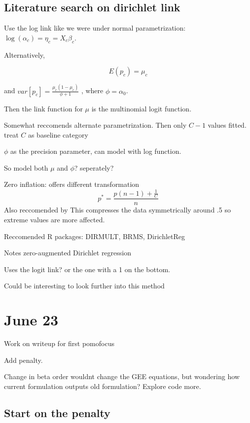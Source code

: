 \documentclass[10pt]{article}
\theoremstyle{definition}
\begin{document}
\subsection{Literature search on dirichlet link }

\cite{douma2019a} Use the log link like we were under normal parametrization: $\log(\alpha_c) = \eta_c = X_c\beta_c$.

Alternatively,

\[E(p_c) = \mu_c \]

and $var[p_c] = \frac{\mu_c(1 - \mu_c)}{\phi+ 1}$ , where $\phi = \alpha_0$.

Then the link function for $\mu$ is the multinomial logit function.

Somewhat reccomends alternate parametrization. Then only $C-1$ values fitted. treat $C$ as baseline category

$\phi$ as the precision parameter, can model with log function.

So model both $\mu$ and $\phi$? seperately?

Zero inflation: offers different transformation
\[p^* = \frac{p(n-1) + \frac{1}{C}}{n} \]
Also reccomended by \cite{maier2014}
This compresses the data symmetrically around .5 so extreme values are more affected.

Reccomended R packages: DIRMULT, BRMS, DirichletReg

Notes zero-augmented Dirichlet regression \cite{tsagris2017}

Uses the logit link? or the one with a 1 on the bottom.

Could be interesting to look further into this method


\section{June 23}

\begin{todolist}
  \item Work on writeup for first pomofocus
  \item Add penalty.
\end{todolist}


Change in beta order wouldnt change the GEE equations, but wondering how current formulation outputs old formulation? Explore code more.


\subsection{Start on the penalty}
\end{document}
